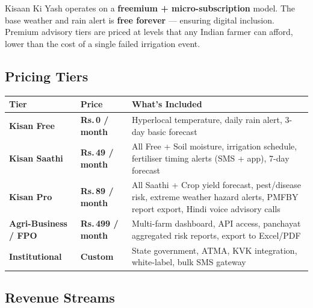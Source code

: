 \documentclass[12pt,a4paper]{article}
\newcommand{\Rup}{\textbf{Rs.\,}}
\begin{document}
Kisaan Ki Yash operates on a \textbf{freemium + micro-subscription} model. The base weather and rain alert is \textbf{free forever} --- ensuring digital inclusion. Premium advisory tiers are priced at levels that any Indian farmer can afford, lower than the cost of a single failed irrigation event.

\subsection{Pricing Tiers}

\begin{center}
\small
\renewcommand{\arraystretch}{1.5}
\begin{tabular}{|p{3cm}|p{2.5cm}|p{7.5cm}|}
\hline
\rowcolor{primaryGreen}
\textbf{\color{white}Tier} & \textbf{\color{white}Price} & \textbf{\color{white}What's Included} \\
\hline
\textbf{Kisan Free} & \textbf{\Rup 0 / month} & Hyperlocal temperature, daily rain alert, 3-day basic forecast \\
\hline
\textbf{Kisan Saathi} & \textbf{\Rup 49 / month} & All Free + Soil moisture, irrigation schedule, fertiliser timing alerts (SMS + app), 7-day forecast \\
\hline
\textbf{Kisan Pro} & \textbf{\Rup 89 / month} & All Saathi + Crop yield forecast, pest/disease risk, extreme weather hazard alerts, PMFBY report export, Hindi voice advisory calls \\
\hline
\textbf{Agri-Business / FPO} & \textbf{\Rup 499 / month} & Multi-farm dashboard, API access, panchayat aggregated risk reports, export to Excel/PDF \\
\hline
\textbf{Institutional} & \textbf{Custom} & State government, ATMA, KVK integration, white-label, bulk SMS gateway \\
\hline
\end{tabular}
\end{center}

\subsection{Revenue Streams}
\end{document}
